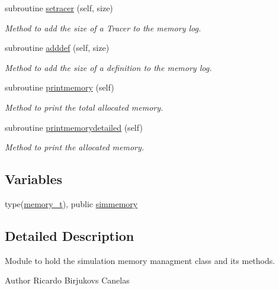 \begin{DoxyCompactItemize}
subroutine \mbox{\hyperlink{namespacesimulationmemory__mod_a3209dc0fdd14fe4a6190e67607076f65}{setracer}} (self, size)
\begin{DoxyCompactList}\small\item\em Method to add the size of a Tracer to the memory log. \end{DoxyCompactList}\item 
subroutine \mbox{\hyperlink{namespacesimulationmemory__mod_a0812b4222f930cfb142586f47b2de0da}{adddef}} (self, size)
\begin{DoxyCompactList}\small\item\em Method to add the size of a definition to the memory log. \end{DoxyCompactList}\item 
subroutine \mbox{\hyperlink{namespacesimulationmemory__mod_a5b7c22d236e24b59599f705f63ba3c09}{printmemory}} (self)
\begin{DoxyCompactList}\small\item\em Method to print the total allocated memory. \end{DoxyCompactList}\item 
subroutine \mbox{\hyperlink{namespacesimulationmemory__mod_a9e12442b1b7b5d105cd70686e04106d3}{printmemorydetailed}} (self)
\begin{DoxyCompactList}\small\item\em Method to print the allocated memory. \end{DoxyCompactList}\end{DoxyCompactItemize}
\subsection*{Variables}
\begin{DoxyCompactItemize}
\item 
type(\mbox{\hyperlink{structsimulationmemory__mod_1_1memory__t}{memory\+\_\+t}}), public \mbox{\hyperlink{namespacesimulationmemory__mod_a47d351637c32a0493b99ed3fb269f22c}{simmemory}}
\end{DoxyCompactItemize}


\subsection{Detailed Description}
Module to hold the simulation memory managment class and its methods. 

\begin{DoxyAuthor}{Author}
Ricardo Birjukovs Canelas 
\end{DoxyAuthor}


